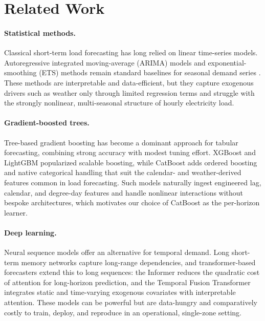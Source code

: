 \section{Related Work}\label{sec:related}

\paragraph{Statistical methods.} Classical short-term load forecasting has long
relied on linear time-series models. Autoregressive integrated moving-average
(ARIMA) models and exponential-smoothing (ETS) methods remain standard baselines
for seasonal demand series \cite{box2015time,hyndman2018forecasting}. These
methods are interpretable and data-efficient, but they capture exogenous drivers
such as weather only through limited regression terms and struggle with the
strongly nonlinear, multi-seasonal structure of hourly electricity load.

\paragraph{Gradient-boosted trees.} Tree-based gradient boosting has become a
dominant approach for tabular forecasting, combining strong accuracy with modest
tuning effort. XGBoost \cite{chen2016xgboost} and LightGBM \cite{ke2017lightgbm}
popularized scalable boosting, while CatBoost \cite{prokhorenkova2018catboost}
adds ordered boosting and native categorical handling that suit the calendar-
and weather-derived features common in load forecasting. Such models naturally
ingest engineered lag, calendar, and degree-day features and handle nonlinear
interactions without bespoke architectures, which motivates our choice of
CatBoost as the per-horizon learner.

\paragraph{Deep learning.} Neural sequence models offer an alternative for
temporal demand. Long short-term memory networks \cite{hochreiter1997lstm}
capture long-range dependencies, and transformer-based forecasters extend this
to long sequences: the Informer \cite{zhou2021informer} reduces the quadratic
cost of attention for long-horizon prediction, and the Temporal Fusion
Transformer \cite{lim2021temporal} integrates static and time-varying exogenous
covariates with interpretable attention. These models can be powerful but are
data-hungry and comparatively costly to train, deploy, and reproduce in an
operational, single-zone setting.

